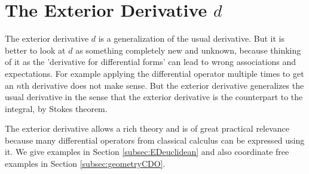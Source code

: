 
\section{The Exterior Derivative $d$}
\label{sec:EC_exteriorDerivative}
The exterior derivative $d$ is a generalization of the usual derivative. But it is better to look at $d$ as something completely new and unknown, because thinking of it as the 'derivative for differential forms' can lead to wrong associations and expectations. For example applying the differential operator multiple times to get an $n$th derivative does not make sense. But the exterior derivative generalizes the usual derivative in the sense that the exterior derivative is the counterpart to the integral, by Stokes theorem.

The exterior derivative allows a rich theory and is of great practical relevance because  many differential operators from classical calculus can be expressed using it. We give examples in Section \ref{subsec:EDeuclidean} and also coordinate free examples in Section \ref{subsec:geometryCDO}.

